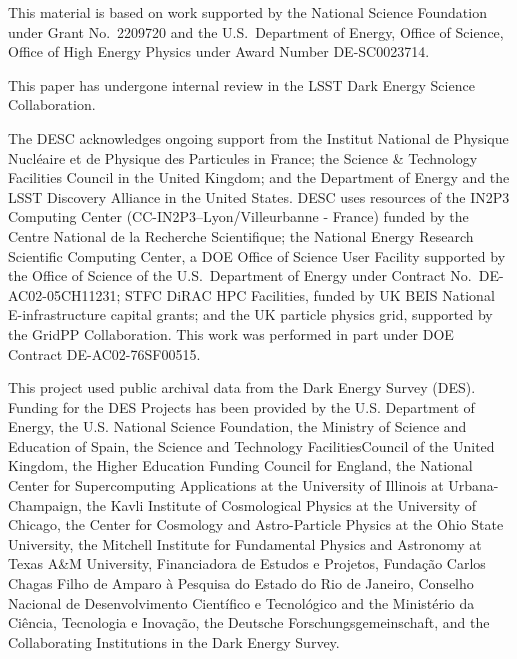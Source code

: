\documentclass[twocolumn]{aastex701}
\begin{document}
\begin{acknowledgments}
This material is based on work supported by the National Science Foundation under Grant
No.~2209720 and the U.S.\ Department of Energy, Office of Science, Office of High Energy
Physics under Award Number DE-SC0023714.

This paper has undergone internal review in the LSST Dark Energy Science Collaboration.

The DESC acknowledges ongoing support from the Institut National de
Physique Nucl\'eaire et de Physique des Particules in France; the
Science \& Technology Facilities Council in the United Kingdom; and the
Department of Energy and the LSST Discovery Alliance
in the United States.  DESC uses resources of the IN2P3
Computing Center (CC-IN2P3--Lyon/Villeurbanne - France) funded by the
Centre National de la Recherche Scientifique; the National Energy
Research Scientific Computing Center, a DOE Office of Science User
Facility supported by the Office of Science of the U.S.\ Department of
Energy under Contract No.\ DE-AC02-05CH11231; STFC DiRAC HPC Facilities,
funded by UK BEIS National E-infrastructure capital grants; and the UK
particle physics grid, supported by the GridPP Collaboration.  This
work was performed in part under DOE Contract DE-AC02-76SF00515.

This project used public archival data from the Dark Energy Survey (DES). Funding for the DES Projects has been provided by the U.S. Department of Energy, the U.S. National Science Foundation, the Ministry of Science and Education of Spain, the Science and Technology FacilitiesCouncil of the United Kingdom, the Higher Education Funding Council for England, the National Center for Supercomputing Applications at the University of Illinois at Urbana-Champaign, the Kavli Institute of Cosmological Physics at the University of Chicago, the Center for Cosmology and Astro-Particle Physics at the Ohio State University, the Mitchell Institute for Fundamental Physics and Astronomy at Texas A\&M University, Financiadora de Estudos e Projetos, Funda{\c c}{\~a}o Carlos Chagas Filho de Amparo {\`a} Pesquisa do Estado do Rio de Janeiro, Conselho Nacional de Desenvolvimento Cient{\'i}fico e Tecnol{\'o}gico and the Minist{\'e}rio da Ci{\^e}ncia, Tecnologia e Inova{\c c}{\~a}o, the Deutsche Forschungsgemeinschaft, and the Collaborating Institutions in the Dark Energy Survey.


\end{acknowledgments}
\end{document}
